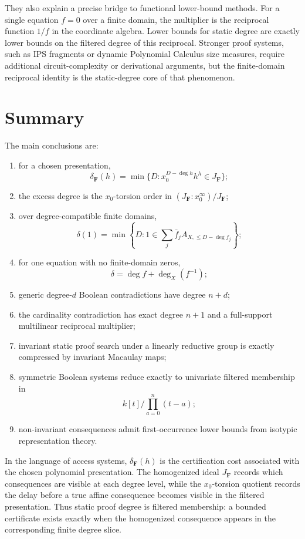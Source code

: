 \documentclass[11pt]{article}
\begin{document}
They also explain a precise bridge to functional lower-bound methods. For a single equation \(f=0\) over a finite domain, the multiplier is the reciprocal function \(1/f\) in the coordinate algebra. Lower bounds for static degree are exactly lower bounds on the filtered degree of this reciprocal. Stronger proof systems, such as IPS fragments or dynamic Polynomial Calculus size measures, require additional circuit-complexity or derivational arguments, but the finite-domain reciprocal identity is the static-degree core of that phenomenon.

\section{Summary}

The main conclusions are:
\begin{enumerate}[label=(\roman*)]
\item for a chosen presentation,
\[
\delta_{\mathbf F}(h)=\min\{D:x_0^{D-\deg h}h^h\in J_{\mathbf F}\};
\]
\item the excess degree is the \(x_0\)-torsion order in \((J_{\mathbf F}:x_0^\infty)/J_{\mathbf F}\);
\item over degree-compatible finite domains,
\[
\delta(1)=
\min\left\{D:
1\in\sum_j \bar f_j A_{X,\le D-\deg f_j}
\right\};
\]
\item for one equation with no finite-domain zeros,
\[
\delta=\deg f+\deg_X(f^{-1});
\]
\item generic degree-\(d\) Boolean contradictions have degree \(n+d\);
\item the cardinality contradiction has exact degree \(n+1\) and a full-support multilinear reciprocal multiplier;
\item invariant static proof search under a linearly reductive group is exactly compressed by invariant Macaulay maps;
\item symmetric Boolean systems reduce exactly to univariate filtered membership in
\[
k[t]/\prod_{a=0}^n(t-a);
\]
\item non-invariant consequences admit first-occurrence lower bounds from isotypic representation theory.
\end{enumerate}

In the language of access systems, \(\delta_{\mathbf F}(h)\) is the certification cost associated with the chosen polynomial presentation. The homogenized ideal \(J_{\mathbf F}\) records which consequences are visible at each degree level, while the \(x_0\)-torsion quotient records the delay before a true affine consequence becomes visible in the filtered presentation. Thus static proof degree is filtered membership: a bounded certificate exists exactly when the homogenized consequence appears in the corresponding finite degree slice.
\end{document}
